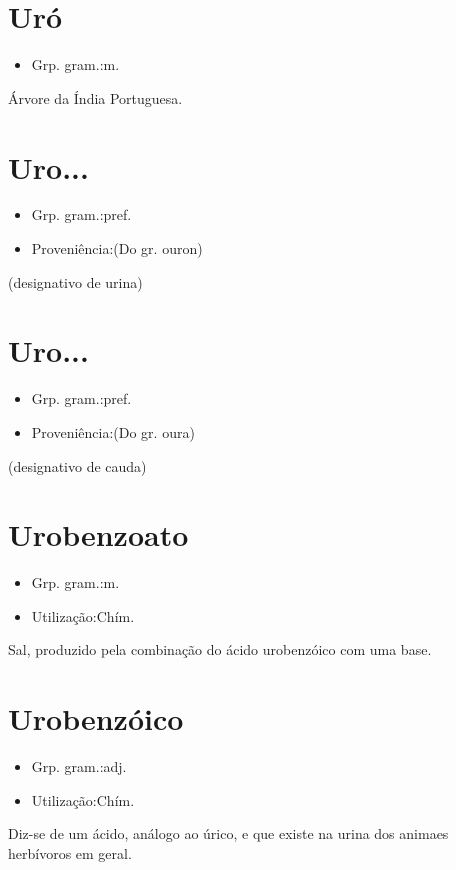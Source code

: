 \documentclass{article}
\begin{document}
\section{Uró}
\begin{itemize}
\item {Grp. gram.:m.}
\end{itemize}
Árvore da Índia Portuguesa.
\section{Uro...}
\begin{itemize}
\item {Grp. gram.:pref.}
\end{itemize}
\begin{itemize}
\item {Proveniência:(Do gr. \textunderscore ouron\textunderscore )}
\end{itemize}
(designativo de \textunderscore urina\textunderscore )
\section{Uro...}
\begin{itemize}
\item {Grp. gram.:pref.}
\end{itemize}
\begin{itemize}
\item {Proveniência:(Do gr. \textunderscore oura\textunderscore )}
\end{itemize}
(designativo de \textunderscore cauda\textunderscore )
\section{Urobenzoato}
\begin{itemize}
\item {Grp. gram.:m.}
\end{itemize}
\begin{itemize}
\item {Utilização:Chím.}
\end{itemize}
Sal, produzido pela combinação do ácido urobenzóico com uma base.
\section{Urobenzóico}
\begin{itemize}
\item {Grp. gram.:adj.}
\end{itemize}
\begin{itemize}
\item {Utilização:Chím.}
\end{itemize}
Diz-se de um ácido, análogo ao úrico, e que existe na urina dos animaes herbívoros em geral.
\end{document}
